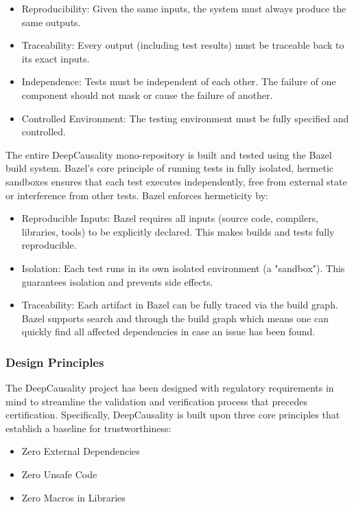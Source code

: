 \begin{itemize}
	\item Reproducibility: Given the same inputs, the system must always produce the same outputs. 
	\item Traceability: Every output (including test results) must be traceable back to its exact inputs.
	\item Independence: Tests must be independent of each other. The failure of one component should not mask or cause the failure of another.
	\item Controlled Environment: The testing environment must be fully specified and controlled.
\end{itemize}


The entire DeepCausality mono-repository is built and tested using the Bazel build system. Bazel's core principle of running tests in fully isolated, hermetic sandboxes ensures that each test executes independently, free from external state or interference from other tests. Bazel enforces hermeticity by:

\begin{itemize}
	\item Reproducible Inputs: Bazel requires all inputs (source code, compilers, libraries, tools) to be explicitly declared. This makes builds and tests fully reproducible.
	\item Isolation: Each test runs in its own isolated environment (a "sandbox"). This guarantees isolation and prevents side effects.
	\item Traceability: Each artifact in Bazel can be fully traced via the build graph. Bazel supports search and through the build graph which means one can quickly find all affected dependencies in case an issue has been found. 
\end{itemize}

\subsubsection{Design Principles}

The DeepCausality project has been designed with regulatory requirements in mind to streamline the validation and verification process that precedes certification. Specifically, DeepCausality is built upon three core principles that establish a baseline for trustworthiness:

\begin{itemize}
	\item Zero External Dependencies
	\item Zero Unsafe Code
	\item Zero Macros in Libraries
\end{itemize}

